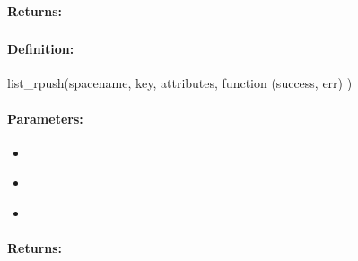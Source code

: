\paragraph{Returns:}


\pagebreak
\subsubsection{}
\label{api:nodejs:list_rpush}


\paragraph{Definition:}
\begin{javascriptcode}
list_rpush(spacename, key, attributes, function (success, err) {})
\end{javascriptcode}
\paragraph{Parameters:}
\begin{itemize}[noitemsep]
\item {}\\

\item {}\\

\item {}\\

\end{itemize}

\paragraph{Returns:}


\pagebreak
\subsubsection{}
\label{api:nodejs:cond_list_rpush}


